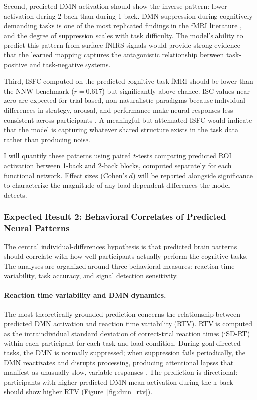 Second, predicted DMN activation should show the inverse pattern: lower activation during 2-back than during 1-back. DMN suppression during cognitively demanding tasks is one of the most replicated findings in the fMRI literature \citep{sonugabarke2007}, and the degree of suppression scales with task difficulty. The model's ability to predict this pattern from surface fNIRS signals would provide strong evidence that the learned mapping captures the antagonistic relationship between task-positive and task-negative systems.

Third, ISFC computed on the predicted cognitive-task fMRI should be lower than the NNW benchmark ($r = 0.617$) but significantly above chance. ISC values near zero are expected for trial-based, non-naturalistic paradigms because individual differences in strategy, arousal, and performance make neural responses less consistent across participants \citep{nastase2019}. A meaningful but attenuated ISFC would indicate that the model is capturing whatever shared structure exists in the task data rather than producing noise.

I will quantify these patterns using paired $t$-tests comparing predicted ROI activation between 1-back and 2-back blocks, computed separately for each functional network. Effect sizes (Cohen's $d$) will be reported alongside significance to characterize the magnitude of any load-dependent differences the model detects.

\subsubsection{Expected Result 2: Behavioral Correlates of Predicted Neural Patterns}

The central individual-differences hypothesis is that predicted brain patterns should correlate with how well participants actually perform the cognitive tasks. The analyses are organized around three behavioral measures: reaction time variability, task accuracy, and signal detection sensitivity.

\paragraph{Reaction time variability and DMN dynamics.} The most theoretically grounded prediction concerns the relationship between predicted DMN activation and reaction time variability (RTV). RTV is computed as the intraindividual standard deviation of correct-trial reaction times (iSD-RT) within each participant for each task and load condition. During goal-directed tasks, the DMN is normally suppressed; when suppression fails periodically, the DMN reactivates and disrupts processing, producing attentional lapses that manifest as unusually slow, variable responses \citep{sonugabarke2007, kofler2013}. The prediction is directional: participants with higher predicted DMN mean activation during the n-back should show higher RTV (Figure~\ref{fig:dmn_rtv}).

